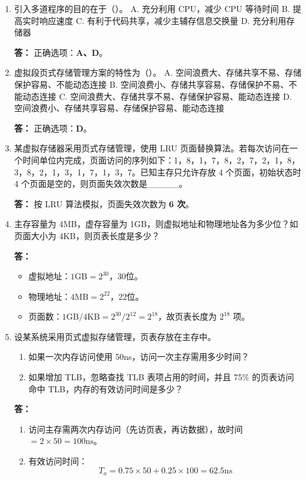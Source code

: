 \documentclass{article}
\begin{document}
\begin{enumerate}[label=\arabic*.]
    \item 引入多道程序的目的在于（）。
    A. 充分利用 CPU，减少 CPU 等待时间
    B. 提高实时响应速度
    C. 有利于代码共享，减少主辅存信息交换量
    D. 充分利用存储器
    
    \textbf{答：}
    正确选项：\textbf{A、D}。

    \item 虚拟段页式存储管理方案的特性为（）。
    A. 空间浪费大、存储共享不易、存储保护容易、不能动态连接
    B. 空间浪费小、存储共享容易、存储保护不易、不能动态连接
    C. 空间浪费大、存储共享不易、存储保护容易、能动态连接
    D. 空间浪费小、存储共享容易、存储保护容易、能动态连接
    
    \textbf{答：}
    正确选项：\textbf{D}。

    \item 某虚拟存储器采用页式存储管理，使用 LRU 页面替换算法。若每次访问在一个时间单位内完成，页面访问的序列如下：1，8，1，7，8，2，7，2，1，8，3，8，2，1，3，1，7，1，3，7。已知主存只允许存放 4 个页面，初始状态时 4 个页面是空的，则页面失效次数是\_\_\_\_\_。
    
    \textbf{答：}
    按 LRU 算法模拟，页面失效次数为 \textbf{6 次}。

    \item 主存容量为 4MB，虚存容量为 1GB，则虚拟地址和物理地址各为多少位？如页面大小为 4KB，则页表长度是多少？
    
    \textbf{答：}
    \begin{itemize}
        \item 虚拟地址：$1\text{GB}=2^{30}$，30位。
        \item 物理地址：$4\text{MB}=2^{22}$，22位。
        \item 页面数：$1\text{GB}/4\text{KB}=2^{30}/2^{12}=2^{18}$，故页表长度为 $2^{18}$ 项。
    \end{itemize}

    \item 设某系统采用页式虚拟存储管理，页表存放在主存中。
    \begin{enumerate}[label=(\arabic*)]
        \item 如果一次内存访问使用 50ns，访问一次主存需用多少时间？
        \item 如果增加 TLB，忽略查找 TLB 表项占用的时间，并且 75\% 的页表访问命中 TLB，内存的有效访问时间是多少？
    \end{enumerate}
    
    \textbf{答：}
    \begin{enumerate}[label=(\arabic*)]
        \item 访问主存需两次内存访问（先访页表，再访数据），故时间 $=2\times50=100\text{ns}$。
        \item 有效访问时间：
        \[
        T_a = 0.75\times50 + 0.25\times100 = 62.5\text{ns}
        \]
    \end{enumerate}


\end{enumerate}
\end{document}
